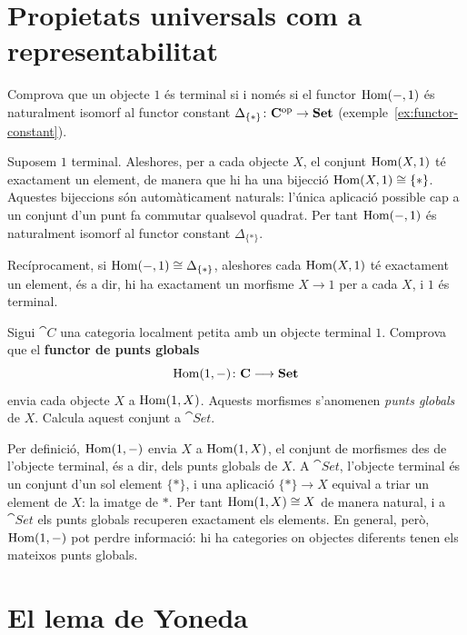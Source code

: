 \section{Propietats universals com a representabilitat}

\begin{exercici}
Comprova que un objecte $1$ és terminal si i només si el functor $\operatorname{Hom}(-,1)$ és naturalment isomorf al functor constant $\Delta_{\{\ast\}}\colon\mathbf{C}^{\mathrm{op}}\to\mathbf{Set}$ (exemple~\ref{ex:functor-constant}).
\end{exercici}

\begin{solucio}
Suposem $1$ terminal. Aleshores, per a cada objecte $X$, el conjunt $\operatorname{Hom}(X,1)$ té exactament un element, de manera que hi ha una bijecció $\operatorname{Hom}(X,1)\cong\{\ast\}$. Aquestes bijeccions són automàticament naturals: l'única aplicació possible cap a un conjunt d'un punt fa commutar qualsevol quadrat. Per tant $\operatorname{Hom}(-,1)$ és naturalment isomorf al functor constant $\Delta_{\{\ast\}}$.

Recíprocament, si $\operatorname{Hom}(-,1)\cong\Delta_{\{\ast\}}$, aleshores cada $\operatorname{Hom}(X,1)$ té exactament un element, és a dir, hi ha exactament un morfisme $X\to 1$ per a cada $X$, i $1$ és terminal.
\end{solucio}

\begin{exercici}
Sigui $\cat{C}$ una categoria localment petita amb un objecte terminal $1$. Comprova que el \textbf{functor de punts globals}
\[
\operatorname{Hom}(1,-)\colon\mathbf{C}\longrightarrow\mathbf{Set}
\]
envia cada objecte $X$ a $\operatorname{Hom}(1,X)$. Aquests morfismes s'anomenen \emph{punts globals} de $X$. Calcula aquest conjunt a $\cat{Set}$.
\end{exercici}

\begin{solucio}
Per definició, $\operatorname{Hom}(1,-)$ envia $X$ a $\operatorname{Hom}(1,X)$, el conjunt de morfismes des de l'objecte terminal, és a dir, dels punts globals de $X$. A $\cat{Set}$, l'objecte terminal és un conjunt d'un sol element $\{\ast\}$, i una aplicació $\{\ast\}\to X$ equival a triar un element de $X$: la imatge de $\ast$. Per tant $\operatorname{Hom}(1,X)\cong X$ de manera natural, i a $\cat{Set}$ els punts globals recuperen exactament els elements. En general, però, $\operatorname{Hom}(1,-)$ pot perdre informació: hi ha categories on objectes diferents tenen els mateixos punts globals.
\end{solucio}

\section{El lema de Yoneda}

